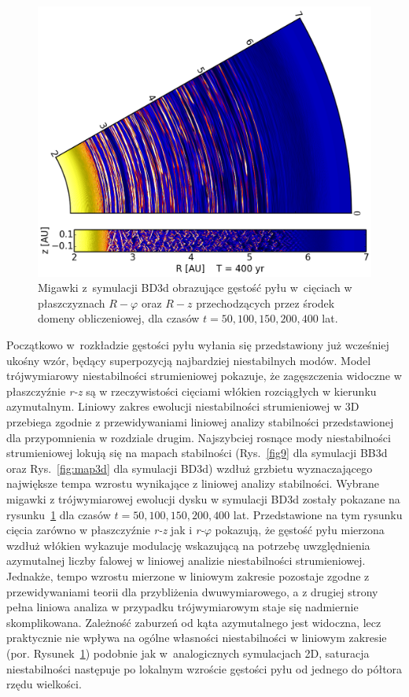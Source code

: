 \begin{figure}
   \includegraphics[width=0.44\linewidth]{figures/slice_nosg_05}
   \caption[Ewolucja gęstości pyłu w symulacji BD3d.]
     {Migawki z~symulacji BD3d obrazujące gęstość pyłu w~cięciach w
      płaszczyznach $R -\varphi$ oraz $R - z$ przechodzących przez środek 
      domeny obliczeniowej, dla czasów $t= 50, 100, 150, 200, 400$ lat.}
   \label{fig:slicenosg}
\end{figure}
%
Początkowo w~rozkładzie gęstości pyłu wyłania się przedstawiony już wcześniej
ukośny wzór, będący superpozycją najbardziej niestabilnych modów.  Model
trójwymiarowy niestabilności strumieniowej pokazuje, że zagęszczenia widoczne w
płaszczyźnie \textit{r-z} są w rzeczywistości cięciami włókien rozciągłych w
kierunku azymutalnym. Liniowy zakres ewolucji niestabilności strumieniowej w 3D
przebiega zgodnie z przewidywaniami liniowej analizy stabilności przedstawionej
dla przypomnienia w rozdziale drugim. Najszybciej rosnące mody niestabilności
strumieniowej lokują się na mapach stabilności (Rys.~\ref{fig9} dla symulacji
BB3d oraz Rys.~\ref{fig:map3d} dla symulacji BD3d) wzdłuż grzbietu
wyznaczającego największe tempa wzrostu wynikające z liniowej
analizy stabilności. Wybrane migawki z trójwymiarowej ewolucji dysku w symulacji
BD3d zostały pokazane na rysunku~\ref{fig:slicenosg} dla czasów $t =  50, 100,
150, 200, 400$ lat. Przedstawione na tym rysunku cięcia zarówno w płaszczyźnie
\textit{r-z} jak i \textit{r-}$\varphi$ pokazują, że gęstość pyłu mierzona
wzdłuż włókien wykazuje modulację wskazującą na potrzebę uwzględnienia
azymutalnej liczby falowej w liniowej analizie niestabilności strumieniowej.
Jednakże, tempo wzrostu mierzone w liniowym zakresie pozostaje zgodne z
przewidywaniami teorii dla przybliżenia dwuwymiarowego, a z drugiej strony pełna
liniowa analiza w przypadku trójwymiarowym staje się nadmiernie skomplikowana.
Zależność zaburzeń od kąta azymutalnego jest widoczna, lecz praktycznie nie
wpływa na ogólne własności niestabilności w liniowym zakresie (por.
Rysunek~\ref{fig:slicenosg}) podobnie jak w~analogicznych symulacjach 2D,
saturacja niestabilności następuje po lokalnym wzroście gęstości pyłu od jednego
do półtora rzędu wielkości.

